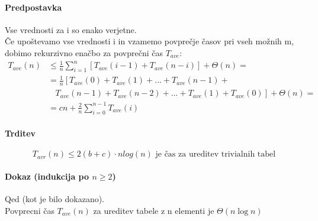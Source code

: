 \documentclass[a4paper,10pt]{article}
\begin{document}
\paragraph{Predpostavka}
Vse vrednosti za i so enako verjetne.\\
\v Ce upo\v stevamo vse vrednosti i in vzamemo povpre\v cje \v casov pri vseh mo\v znih m, dobimo rekurzivno ena\v cbo za povpre\v cni \v cas $T_{ave}$:
$$
\begin{array}{ll}
T_{ave}(n) & \leq \frac{1}{n} \sum_{i=1}^n \left[ T_{ave}(i-1) + T_{ave}(n-i) \right] + \Theta(n) = \\
 & = \frac{1}{n} \left[ T_{ave}(0) + T_{ave}(1) + ... + T_{ave}(n-1) + \right. \\
 & \left. \:\:\:\: T_{ave}(n-1) + T_{ave}(n-2) + ... + T_{ave}(1) + T_{ave}(0) \right] + \Theta(n) = \\
 & = cn + \frac{2}{n} \sum_{i=0}^{n-1} T_{ave}(i)
\end{array}
$$

\paragraph{Trditev}
$$
T_{avr}(n) \le 2(b + c)\cdot n log (n) \mbox{ je \v cas za ureditev trivialnih tabel}
$$

\paragraph{Dokaz (indukcija po $n \ge 2$)}

Qed (kot je bilo dokazano).\\
Povprecni \v cas $T_{ave} (n)$ za ureditev tabele z n elementi je $\Theta (n\log n)$\\
\end{document}

